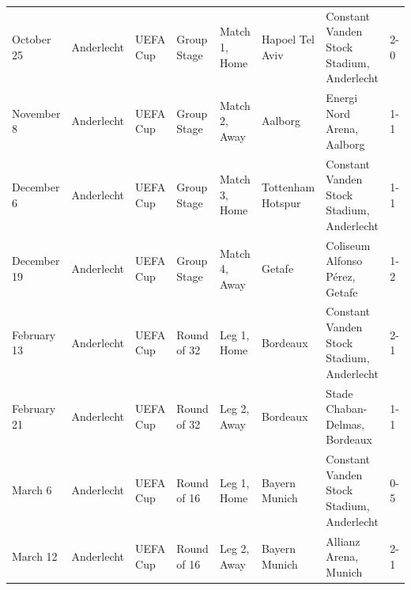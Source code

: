 \documentclass{article}
\begin{document}
\begin{tabular}{llllllll}
October 25 & Anderlecht & UEFA Cup & Group Stage & Match 1, Home & Hapoel Tel Aviv & Constant Vanden Stock Stadium, Anderlecht & 2-0 \\
November 8 & Anderlecht & UEFA Cup & Group Stage & Match 2, Away & Aalborg & Energi Nord Arena, Aalborg & 1-1 \\
December 6 & Anderlecht & UEFA Cup & Group Stage & Match 3, Home & Tottenham Hotspur & Constant Vanden Stock Stadium, Anderlecht & 1-1 \\
December 19 & Anderlecht & UEFA Cup & Group Stage & Match 4, Away & Getafe & Coliseum Alfonso Pérez, Getafe & 1-2 \\
February 13 & Anderlecht & UEFA Cup & Round of 32 & Leg 1, Home & Bordeaux & Constant Vanden Stock Stadium, Anderlecht & 2-1 \\
February 21 & Anderlecht & UEFA Cup & Round of 32 & Leg 2, Away & Bordeaux & Stade Chaban-Delmas, Bordeaux & 1-1 \\
March 6 & Anderlecht & UEFA Cup & Round of 16 & Leg 1, Home & Bayern Munich & Constant Vanden Stock Stadium, Anderlecht & 0-5 \\
March 12 & Anderlecht & UEFA Cup & Round of 16 & Leg 2, Away & Bayern Munich & Allianz Arena, Munich & 2-1 \\
\bottomrule
\end{tabular}
\end{document}
